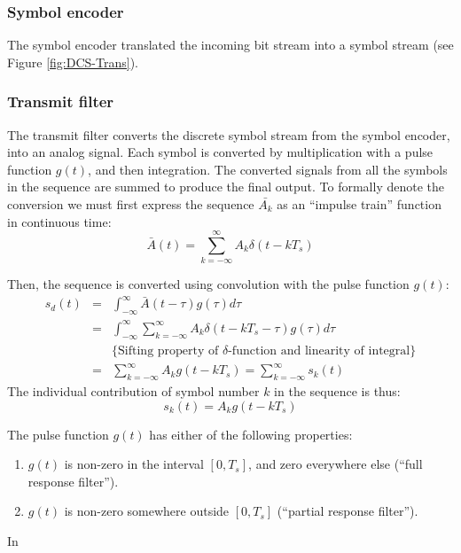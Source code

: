 \documentclass[onecolumn,x11names,technote,twoside,a4paper,10pt,english]{IEEEtran}
\begin{document}
\subsubsection{Symbol encoder}
\label{sec:sym-enc}
The symbol encoder translated the incoming bit stream into a symbol stream (see Figure \ref{fig:DCS-Trans}).

\subsubsection{Transmit filter}
\label{sec:bb-tf}
The transmit filter converts the discrete symbol stream from the symbol encoder, into an analog signal. Each symbol is converted by multiplication with a pulse function $g(t)$, and then integration. The converted signals from all the symbols in the sequence are summed to produce the final output. To formally denote the conversion we must first express the sequence $\bar{A_k}$ as an ``impulse train'' function in continuous time: 
\begin{equation*}
  \bar{A}(t) = \sum_{k=-\infty}^{\infty}{A_k \delta(t - kT_s)}
\end{equation*}

Then, the sequence is converted using convolution with the pulse function $g(t)$:
\begin{eqnarray*}
  s_d(t) &=& \int_{-\infty}^{\infty}{\bar{A}(t-\tau) g(\tau) d\tau} \\
         &=& \int_{-\infty}^{\infty}{\sum_{k=-\infty}^{\infty}{A_k \delta(t - kT_s - \tau) } g(\tau) d\tau}  \\
         && \mbox{\{Sifting property of $\delta$-function and linearity of integral\}} \\
         &=& \sum_{k=-\infty}^{\infty}{A_k g(t - k T_s)} = \sum_{k=-\infty}^{\infty}{s_k(t)}
\end{eqnarray*}
The individual contribution of symbol number $k$ in the sequence is thus:
\begin{equation*}
  s_k(t) = A_k g(t - k T_s)
\end{equation*}

The pulse function $g(t)$ has either of the following properties:
\begin{enumerate}
\item $g(t)$ is non-zero in the interval $[0,T_s]$, and zero everywhere else (``full response filter'').
\item $g(t)$ is non-zero somewhere outside $[0,T_s]$ (``partial response filter'').
\end{enumerate}
In 

\clearpage


\end{document}

